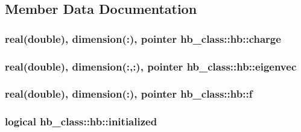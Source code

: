 \subsection{Member Data Documentation}
\hypertarget{structhb__class_1_1hb_ae5d949ad83b1c2491acca3fedb59127f}{
\subsubsection[{charge}]{\setlength{\rightskip}{0pt plus 5cm}real(double), dimension(\+:), pointer hb\+\_\+class\+::hb\+::charge\hspace{0.3cm}{\ttfamily [private]}}}\label{structhb__class_1_1hb_ae5d949ad83b1c2491acca3fedb59127f}
\hypertarget{structhb__class_1_1hb_ac62b62b36a6c37ba8477efc35c6f97bf}{
\subsubsection[{eigenvec}]{\setlength{\rightskip}{0pt plus 5cm}real(double), dimension(\+:,\+:), pointer hb\+\_\+class\+::hb\+::eigenvec\hspace{0.3cm}{\ttfamily [private]}}}\label{structhb__class_1_1hb_ac62b62b36a6c37ba8477efc35c6f97bf}
\hypertarget{structhb__class_1_1hb_af871a155778593b68d1a0b12f20a9296}{
\subsubsection[{f}]{\setlength{\rightskip}{0pt plus 5cm}real(double), dimension(\+:), pointer hb\+\_\+class\+::hb\+::f\hspace{0.3cm}{\ttfamily [private]}}}\label{structhb__class_1_1hb_af871a155778593b68d1a0b12f20a9296}
\hypertarget{structhb__class_1_1hb_ab15f7134343b95cad3a633262c4d1ae6}{
\subsubsection[{initialized}]{\setlength{\rightskip}{0pt plus 5cm}logical hb\+\_\+class\+::hb\+::initialized\hspace{0.3cm}{\ttfamily [private]}}}\label{structhb__class_1_1hb_ab15f7134343b95cad3a633262c4d1ae6}
